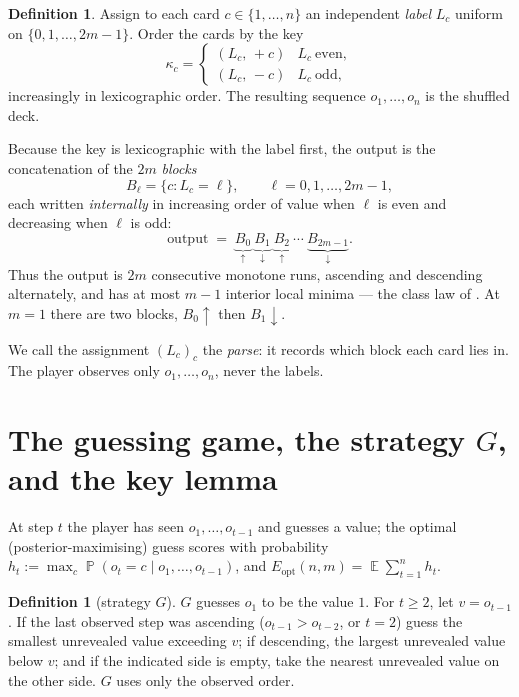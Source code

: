 \documentclass[11pt]{article}
\theoremstyle{definition}
\newtheorem{definition}[theorem]{Definition}
\DeclareMathOperator{\PP}{\mathbb{P}}
\DeclareMathOperator{\EE}{\mathbb{E}}
\newcommand{\eopt}{E_{\mathrm{opt}}}
\begin{document}
\begin{definition}\label{def:shuffle}
Assign to each card $c\in\{1,\dots,n\}$ an independent \emph{label}
$L_c$ uniform on $\{0,1,\dots,2m-1\}$. Order the cards by the key
\[
  \kappa_c=\begin{cases}(L_c,\,+c) & L_c\ \text{even},\\[2pt] (L_c,\,-c) & L_c\ \text{odd},\end{cases}
\]
increasingly in lexicographic order. The resulting sequence $o_1,\dots,o_n$ is the shuffled
deck.
\end{definition}

Because the key is lexicographic with the label first, the output is the concatenation of the
$2m$ \emph{blocks}
\[
  B_\ell=\{c: L_c=\ell\},\qquad \ell=0,1,\dots,2m-1,
\]
each written \emph{internally} in increasing order of value when $\ell$ is even and decreasing
when $\ell$ is odd:
\[
  \text{output}\;=\;\underbrace{B_0}_{\uparrow}\ \underbrace{B_1}_{\downarrow}\ \underbrace{B_2}_{\uparrow}\ \cdots\ \underbrace{B_{2m-1}}_{\downarrow}.
\]
Thus the output is $2m$ consecutive monotone runs, ascending and descending alternately, and
has at most $m-1$ interior local minima --- the class law of \cite[Thm.~3.1]{DFH}. At $m=1$
there are two blocks, $B_0\!\uparrow$ then $B_1\!\downarrow$.

We call the assignment $(L_c)_c$ the \emph{parse}: it records which block each card lies in.
The player observes only $o_1,\dots,o_n$, never the labels.

\section{The guessing game, the strategy \texorpdfstring{$G$}{G}, and the key lemma}\label{sec:lemma}

At step $t$ the player has seen $o_1,\dots,o_{t-1}$ and guesses a value; the optimal
(posterior-maximising) guess scores with probability $h_t:=\max_c \PP(o_t=c\mid
o_1,\dots,o_{t-1})$, and $\eopt(n,m)=\EE\sum_{t=1}^n h_t$.

\begin{definition}[strategy $G$]\label{def:G}
$G$ guesses $o_1$ to be the value $1$. For $t\ge2$, let $v=o_{t-1}$. If the last observed step
was ascending ($o_{t-1}>o_{t-2}$, or $t=2$) guess the smallest unrevealed value exceeding $v$;
if descending, the largest unrevealed value below $v$; and if the indicated side is empty,
take the nearest unrevealed value on the other side. $G$ uses only the observed order.
\end{definition}
\end{document}
